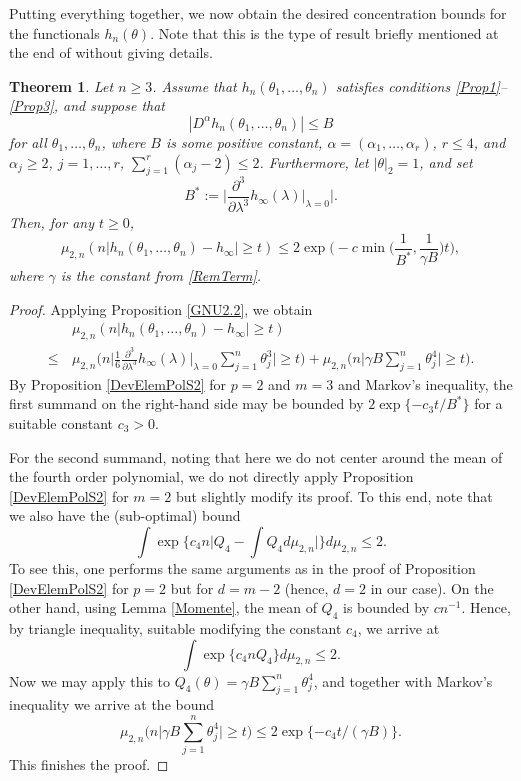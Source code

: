 \documentclass[a4paper,12pt]{amsart}
\numberwithin{equation}{section}
\newtheorem{satz}{Theorem}[section]
\theoremstyle{remark}
\begin{document}
Putting everything together, we now obtain the desired concentration bounds for the functionals $h_n(\theta)$. Note that this is the type of result briefly mentioned at the end of \cite[Ch.\ 10.9]{BCG23} without giving details.

\begin{satz}\label{applsymm}
    Let $n \ge 3$. Assume that $h_n(\theta_1,\ldots, \theta_n)$ satisfies conditions \eqref{Prop1}--\eqref{Prop3}, and suppose that
\[
|D^\alpha h_n(\theta_1, \ldots, \theta_n)| \le B
\]
for all $\theta_1, \ldots, \theta_n$, where $B$ is some positive constant, $\alpha = (\alpha_1, \ldots, \alpha_r)$, $r \le 4$, and $\alpha_j \ge 2$, $j=1,\ldots, r$, $\sum_{j=1}^r (\alpha_j -2) \le 2$. Furthermore, let $|\theta|_2 = 1$, and set
\[
B^\ast := \Big|\frac{\partial^3}{\partial \lambda^3} h_\infty(\lambda) \Big|_{\lambda=0}\Big|.
\]
Then, for any $t \ge 0$,
    \[
    \mu_{2,n}(n|h_n(\theta_1, \ldots, \theta_n) - h_\infty| \ge t) \le 2 \exp \Big(- c \min\Big(\frac{1}{B^\ast}, \frac{1}{\gamma B}\Big) t\Big),
    \]
    where $\gamma$ is the constant from \eqref{RemTerm}.
\end{satz}

\begin{proof}
    Applying Proposition \ref{GNU2.2}, we obtain
    \begin{align*}
    &\mu_{2,n}(n|h_n(\theta_1, \ldots, \theta_n) - h_\infty| \ge t)\\
    \le \, &\mu_{2,n}\Big(n\Big| \frac{1}{6} \frac{\partial^3}{\partial \lambda^3} h_\infty(\lambda) \Big|_{\lambda=0} \sum_{j=1}^n\theta_j^3\Big| \ge t\Big)
    + \mu_{2,n}\Big(n\Big| \gamma B \sum_{j=1}^n \theta_j^4 \Big| \ge t\Big).
    \end{align*}
    By Proposition \ref{DevElemPolS2} for $p=2$ and $m=3$ and Markov's inequality, the first summand on the right-hand side may be bounded by $2\exp\{-c_3t/B^\ast\}$ for a suitable constant $c_3 > 0$.
    
    For the second summand, noting that here we do not center around the mean of the fourth order polynomial, we do not directly apply Proposition \ref{DevElemPolS2} for $m=2$ but slightly modify its proof. To this end, note that we also have the (sub-optimal) bound
    \[
	\int \exp\Big\{c_4 n\Big|Q_4 - \int Q_4d\mu_{2,n}\Big|\Big\} d\mu_{2,n} \le 2.
	\]
    To see this, one performs the same arguments as in the proof of Proposition \ref{DevElemPolS2} for $p=2$ but for $d=m-2$ (hence, $d=2$ in our case). On the other hand, using Lemma \ref{Momente}, the mean of $Q_4$ is bounded by $cn^{-1}$. Hence, by triangle inequality, suitable modifying the constant $c_4$, we arrive at
    \[
	\int \exp\{c_4 nQ_4\} d\mu_{2,n} \le 2.
	\]
    Now we may apply this to $Q_4(\theta) = \gamma B \sum_{j=1}^n \theta_j^4$, and together with Markov's inequality we arrive at the bound
    \[
    \mu_{2,n}\Big(n\Big| \gamma B \sum_{j=1}^n \theta_j^4 \Big| \ge t\Big) \le 2\exp\{-c_4t/(\gamma B)\}.
    \]
    This finishes the proof.
\end{proof}
\end{document}
